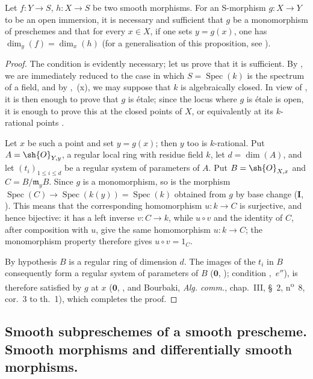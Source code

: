 \begin{proposition}[17.11.5]
\label{IV.17.11.5}
Let $f:Y\to S$, $h:X\to S$ be two smooth morphisms.
For an S-morphism $g:X\to Y$ to be an open immersion, it is necessary and sufficient that $g$ be a monomorphism of preschemes and that for every $x\in X$, if one sets $y=g(x)$, one has $\dim_y(f)=\dim_x(h)$ (for a generalisation of this proposition, see ).
\end{proposition}

\begin{proof}
The condition is evidently necessary; let us prove that it is sufficient.
By , we are immediately reduced to the case in which $S=\operatorname{Spec}(k)$ is the spectrum of a field, and by ,~(x), we may suppose that $k$ is algebraically closed.
In view of , it is then enough to prove that $g$ is \'etale; since the locus where $g$ is \'etale is open, it is enough to prove this at the closed points of $X$, or equivalently at its $k$-rational points .

Let $x$ be such a point and set $y=g(x)$; then $y$ too is $k$-rational.
Put $A=\sh{O}_{Y,y}$, a regular local ring with residue field $k$, let $d=\dim(A)$, and let $(t_i)_{1\leq i\leq d}$ be a regular system of parameters of $A$.
Put $B=\sh{O}_{X,x}$ and $C=B/\mathfrak m_yB$.
Since $g$ is a monomorphism, so is the morphism
$\operatorname{Spec}(C)\to\operatorname{Spec}(k(y))=\operatorname{Spec}(k)$ obtained from $g$ by base change ($\mathbf{I}$, ).
This means that the corresponding homomorphism $u:k\to C$ is surjective, and hence bijective: it has a left inverse $v:C\to k$, while $u\circ v$ and the identity of $C$, after composition with $u$, give the same homomorphism $u:k\to C$; the monomorphism property therefore gives $u\circ v=1_C$.

By hypothesis $B$ is a regular ring of dimension $d$.
The images of the $t_i$ in $B$ consequently form a regular system of parameters of $B$ ($\mathbf{0}$, ); condition ,~$e''$), is therefore satisfied by $g$ at $x$ ($\mathbf{0}$, , and Bourbaki, \emph{Alg. comm.}, chap.~III, \S~2, n\textsuperscript{o}~8, cor.~3 to th.~1), which completes the proof.
\end{proof}


\subsection{Smooth subpreschemes of a smooth prescheme. Smooth morphisms and differentially smooth morphisms.}
\label{subsection:IV.17.12}

